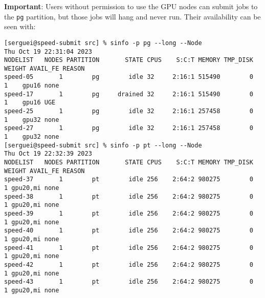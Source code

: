 \noindent \textbf{Important}:
Users without permission to use the GPU nodes can submit jobs to the \texttt{pg}
partition, but those jobs will hang and never run.
Their availability can be seen with:
%
%
\small
\begin{verbatim}
[serguei@speed-submit src] % sinfo -p pg --long --Node
Thu Oct 19 22:31:04 2023
NODELIST   NODES PARTITION       STATE CPUS    S:C:T MEMORY TMP_DISK WEIGHT AVAIL_FE REASON
speed-05       1        pg        idle 32     2:16:1 515490        0      1    gpu16 none
speed-17       1        pg     drained 32     2:16:1 515490        0      1    gpu16 UGE
speed-25       1        pg        idle 32     2:16:1 257458        0      1    gpu32 none
speed-27       1        pg        idle 32     2:16:1 257458        0      1    gpu32 none
[serguei@speed-submit src] % sinfo -p pt --long --Node
Thu Oct 19 22:32:39 2023
NODELIST   NODES PARTITION       STATE CPUS    S:C:T MEMORY TMP_DISK WEIGHT AVAIL_FE REASON
speed-37       1        pt        idle 256    2:64:2 980275        0      1 gpu20,mi none
speed-38       1        pt        idle 256    2:64:2 980275        0      1 gpu20,mi none
speed-39       1        pt        idle 256    2:64:2 980275        0      1 gpu20,mi none
speed-40       1        pt        idle 256    2:64:2 980275        0      1 gpu20,mi none
speed-41       1        pt        idle 256    2:64:2 980275        0      1 gpu20,mi none
speed-42       1        pt        idle 256    2:64:2 980275        0      1 gpu20,mi none
speed-43       1        pt        idle 256    2:64:2 980275        0      1 gpu20,mi none
\end{verbatim}
\normalsize

